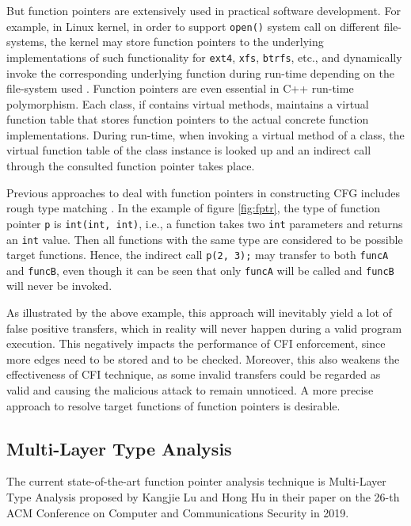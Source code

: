 \documentclass[12pt]{article}
\begin{document}
But function pointers are extensively used in practical software development. For example, in Linux kernel, in order to support \texttt{open()} system call on different file-systems, the kernel may store function pointers to the underlying implementations of such functionality for \texttt{ext4}, \texttt{xfs}, \texttt{btrfs}, etc., and dynamically invoke the corresponding underlying function during run-time depending on the file-system used \cite{mlta}. Function pointers are even essential in C++ run-time polymorphism. Each class, if contains virtual methods, maintains a virtual function table that stores function pointers to the actual concrete function implementations. During run-time, when invoking a virtual method of a class, the virtual function table of the class instance is looked up and an indirect call through the consulted function pointer takes place.

Previous approaches to deal with function pointers in constructing CFG includes rough type matching \cite{modular-cfi}. In the example of figure \ref{fig:fptr}, the type of function pointer \texttt{p} is \texttt{int(int, int)}, i.e., a function takes two \texttt{int} parameters and returns an \texttt{int} value. Then all functions with the same type are considered to be possible target functions. Hence, the indirect call \texttt{p(2, 3);} may transfer to both \texttt{funcA} and \texttt{funcB}, even though it can be seen that only \texttt{funcA} will be called and \texttt{funcB} will never be invoked.

As illustrated by the above example, this approach will inevitably yield a lot of false positive transfers, which in reality will never happen during a valid program execution. This negatively impacts the performance of CFI enforcement, since more edges need to be stored and to be checked. Moreover, this also weakens the effectiveness of CFI technique, as some invalid transfers could be regarded as valid and causing the malicious attack to remain unnoticed. A more precise approach to resolve target functions of function pointers is desirable.

\subsection{Multi-Layer Type Analysis}
\label{subsection:mlta}

The current state-of-the-art function pointer analysis technique is Multi-Layer Type Analysis proposed by Kangjie Lu and Hong Hu in their paper \cite{mlta} on the 26-th ACM Conference on Computer and Communications Security in 2019.
\end{document}

